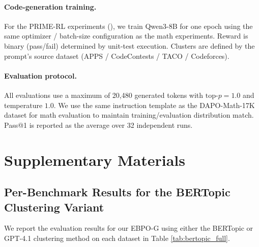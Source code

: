 \documentclass{article}
\theoremstyle{plain}
\theoremstyle{definition}
\theoremstyle{remark}
\newcommand{\oursG}{\textsc{EBPO-G}\xspace}
\begin{document}
\paragraph{Code-generation training.}
For the PRIME-RL experiments (), we train Qwen3-8B for one epoch using the same optimizer / batch-size configuration as the math experiments. Reward is binary (pass/fail) determined by unit-test execution. Clusters are defined by the prompt's source dataset (APPS / CodeContests / TACO / Codeforces).

\paragraph{Evaluation protocol.}
All evaluations use a maximum of 20{,}480 generated tokens with $\text{top-}p=1.0$ and temperature $1.0$. We use the same instruction template as the DAPO-Math-17K dataset for math evaluation to maintain training/evaluation distribution match. Pass@1 is reported as the average over 32 independent runs.

\section{Supplementary Materials}
\label{sec:supp_materials}

\subsection{Per-Benchmark Results for the BERTopic Clustering Variant}

We report the evaluation results for our \oursG using either the BERTopic or GPT-4.1 clustering method on each dataset in Table \ref{tab:bertopic_full}.
\end{document}
